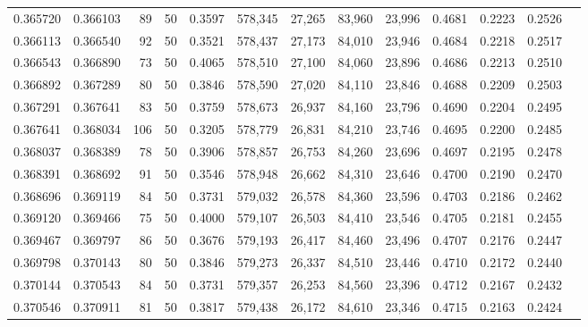 \begin{tabular}{rrrrrrrrrrrrr}
0.365720 & 0.366103 &    89 &  50 &                                     0.3597 & 578,345 &  27,265 &  83,960 &  23,996 & 0.4681 & 0.2223 & 0.2526 \\
0.366113 & 0.366540 &    92 &  50 &                                     0.3521 & 578,437 &  27,173 &  84,010 &  23,946 & 0.4684 & 0.2218 & 0.2517 \\
0.366543 & 0.366890 &    73 &  50 &                                     0.4065 & 578,510 &  27,100 &  84,060 &  23,896 & 0.4686 & 0.2213 & 0.2510 \\
0.366892 & 0.367289 &    80 &  50 &                                     0.3846 & 578,590 &  27,020 &  84,110 &  23,846 & 0.4688 & 0.2209 & 0.2503 \\
0.367291 & 0.367641 &    83 &  50 &                                     0.3759 & 578,673 &  26,937 &  84,160 &  23,796 & 0.4690 & 0.2204 & 0.2495 \\
0.367641 & 0.368034 &   106 &  50 &                                     0.3205 & 578,779 &  26,831 &  84,210 &  23,746 & 0.4695 & 0.2200 & 0.2485 \\
0.368037 & 0.368389 &    78 &  50 &                                     0.3906 & 578,857 &  26,753 &  84,260 &  23,696 & 0.4697 & 0.2195 & 0.2478 \\
0.368391 & 0.368692 &    91 &  50 &                                     0.3546 & 578,948 &  26,662 &  84,310 &  23,646 & 0.4700 & 0.2190 & 0.2470 \\
0.368696 & 0.369119 &    84 &  50 &                                     0.3731 & 579,032 &  26,578 &  84,360 &  23,596 & 0.4703 & 0.2186 & 0.2462 \\
0.369120 & 0.369466 &    75 &  50 &                                     0.4000 & 579,107 &  26,503 &  84,410 &  23,546 & 0.4705 & 0.2181 & 0.2455 \\
0.369467 & 0.369797 &    86 &  50 &                                     0.3676 & 579,193 &  26,417 &  84,460 &  23,496 & 0.4707 & 0.2176 & 0.2447 \\
0.369798 & 0.370143 &    80 &  50 &                                     0.3846 & 579,273 &  26,337 &  84,510 &  23,446 & 0.4710 & 0.2172 & 0.2440 \\
0.370144 & 0.370543 &    84 &  50 &                                     0.3731 & 579,357 &  26,253 &  84,560 &  23,396 & 0.4712 & 0.2167 & 0.2432 \\
0.370546 & 0.370911 &    81 &  50 &                                     0.3817 & 579,438 &  26,172 &  84,610 &  23,346 & 0.4715 & 0.2163 & 0.2424 \\

\end{tabular}
